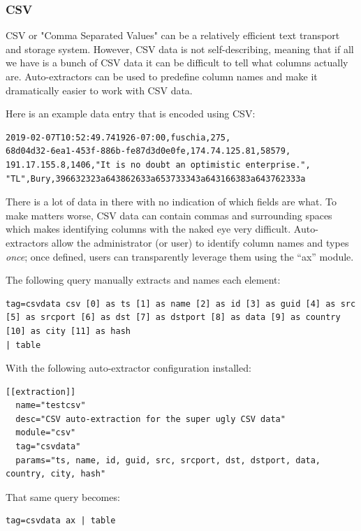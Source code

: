 \subsubsection{CSV}

CSV or "Comma Separated Values" can be a relatively efficient text
transport and storage system. However, CSV data is not self-describing,
meaning that if all we have is a bunch of CSV data it can be difficult
to tell what columns actually are. Auto-extractors can be used to
predefine column names and make it dramatically easier to work with CSV
data.

Here is an example data entry that is encoded using CSV:

\begin{Verbatim}[breaklines=true]
2019-02-07T10:52:49.741926-07:00,fuschia,275,
68d04d32-6ea1-453f-886b-fe87d3d0e0fe,174.74.125.81,58579,
191.17.155.8,1406,"It is no doubt an optimistic enterprise.",
"TL",Bury,396632323a643862633a653733343a643166383a643762333a
\end{Verbatim}

There is a lot of data in there with no indication of which fields are
what. To make matters worse, CSV data can contain commas and surrounding
spaces which makes identifying columns with the naked eye very
difficult. Auto-extractors allow the administrator (or user) to identify column
names and types \emph{once}; once defined, users can transparently leverage
them using the ``ax'' module.

The following query manually extracts and names each element:

\begin{Verbatim}[breaklines=true]
tag=csvdata csv [0] as ts [1] as name [2] as id [3] as guid [4] as src 
[5] as srcport [6] as dst [7] as dstport [8] as data [9] as country 
[10] as city [11] as hash
| table
\end{Verbatim}

With the following auto-extractor configuration installed:

\begin{Verbatim}[breaklines=true]
[[extraction]]
  name="testcsv"
  desc="CSV auto-extraction for the super ugly CSV data"
  module="csv"
  tag="csvdata"
  params="ts, name, id, guid, src, srcport, dst, dstport, data, country, city, hash"
\end{Verbatim}

That same query becomes:

\begin{Verbatim}[breaklines=true]
tag=csvdata ax | table
\end{Verbatim}

